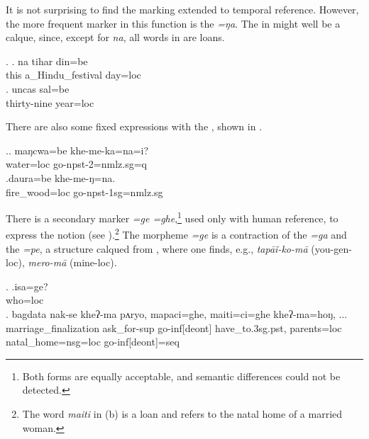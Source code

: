 It is not surprising to find the  marking extended to temporal reference. However, the more frequent marker in this function is the  \emph{=ŋa}. The  in \Next might well be a  calque, since, except for \emph{na}, all words in \Next are  loans. 

\ex. \ag. na tihar din=be\\
		this a\_Hindu\_festival day{\sc =loc}	\\
	 
 	\bg. uncas sal=be\\
	thirty-nine year{\sc =loc}		\\
	 

	There are also some fixed expressions with the , shown in \Next.
	
	\ex.\ag. maŋcwa=be  khe-me-ka=na=i?\\
	water{\sc =loc} go{\sc -npst-2=nmlz.sg=q}\\
	 	
	\bg.daura=be khe-me-ŋ=na.\\
	fire\_wood{\sc =loc} go{\sc -npst-1sg=nmlz.sg}\\
	
There is a secondary  marker \emph{=ge \ti =ghe},\footnote{Both forms are equally acceptable, and semantic differences could not be detected.} used only with human reference, to express the notion  (see \Next).\footnote{The word \emph{maiti} in (b) is a  loan and refers to the natal home of a married woman.} The morpheme \emph{=ge} is a contraction of the  \emph{=ga} and the  \emph{=pe}, a structure calqued from , where one finds, e.g.,  \emph{tapāĩ-ko-mā}  (you-{\sc gen-loc}), \emph{mero-mā}  (mine-{\sc loc}). 

\ex. \ag.isa=ge?\\
		who{\sc =loc}\\
 	\bg. bagdata nak-se      kheʔ-ma   pʌryo,  mapaci=ghe,      maiti=ci=ghe   kheʔ-ma=hoŋ, ...\\
		marriage\_finalization ask\_for{\sc -sup} go{\sc -inf[deont]} have\_to{\sc .3sg.pst},  parents{\sc =loc} natal\_home{\sc =nsg=loc} go{\sc -inf[deont]=seq} \\
	

